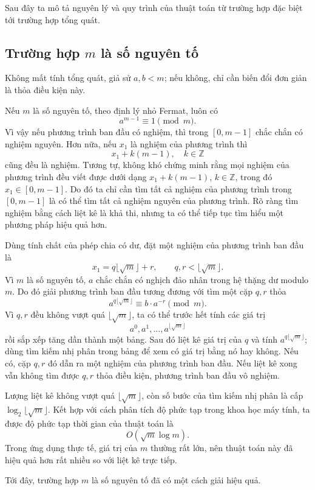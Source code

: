 \documentclass[11pt]{article}
\begin{document}
Sau đây ta mô tả nguyên lý và quy trình của thuật toán từ trường hợp đặc biệt
tới trường hợp tổng quát.

\subsection{Trường hợp \texorpdfstring{$m$}{m} là số nguyên tố}

Không mất tính tổng quát, giả sử $a,b<m$; nếu không, chỉ cần biến đổi đơn
giản là thỏa điều kiện này.

Nếu $m$ là số nguyên tố, theo định lý nhỏ Fermat, luôn có
\[
  a^{m-1}\equiv 1 \pmod m.
\]
Vì vậy nếu phương trình ban đầu có nghiệm, thì trong $[0,m-1]$ chắc chắn có
nghiệm nguyên. Hơn nữa, nếu $x_1$ là nghiệm của phương trình thì
\[
  x_1+k(m-1),\quad k\in\mathbb Z
\]
cũng đều là nghiệm. Tương tự, không khó chứng minh rằng mọi nghiệm của phương
trình đều viết được dưới dạng $x_1+k(m-1)$, $k\in\mathbb Z$, trong đó
$x_1\in[0,m-1]$. Do đó ta chỉ cần tìm tất cả nghiệm của phương trình trong
$[0,m-1]$ là có thể tìm tất cả nghiệm nguyên của phương trình. Rõ ràng tìm
nghiệm bằng cách liệt kê là khả thi, nhưng ta có thể tiếp tục tìm hiểu một
phương pháp hiệu quả hơn.

Dùng tính chất của phép chia có dư, đặt một nghiệm của phương trình ban đầu là
\[
  x_1=q\lfloor\sqrt m\rfloor+r,\qquad q,r<\lfloor\sqrt m\rfloor.
\]
Vì $m$ là số nguyên tố, $a$ chắc chắn có nghịch đảo nhân trong hệ thặng dư
modulo $m$. Do đó giải phương trình ban đầu tương đương với tìm một cặp
$q,r$ thỏa
\[
  a^{q\lfloor\sqrt m\rfloor}\equiv b\cdot a^{-r}\pmod m.
\]
Vì $q,r$ đều không vượt quá $\lfloor\sqrt m\rfloor$, ta có thể trước hết tính
các giá trị
\[
  a^0,a^1,\ldots,a^{\lfloor\sqrt m\rfloor}
\]
rồi sắp xếp tăng dần thành một bảng. Sau đó liệt kê giá trị của $q$ và tính
$a^{q\lfloor\sqrt m\rfloor}$; dùng tìm kiếm nhị phân trong bảng để xem có giá
trị bằng nó hay không. Nếu có, cặp $q,r$ đó dẫn ra một nghiệm của phương trình
ban đầu. Nếu liệt kê xong vẫn không tìm được $q,r$ thỏa điều kiện, phương
trình ban đầu vô nghiệm.

Lượng liệt kê không vượt quá $\lfloor\sqrt m\rfloor$, còn số bước của tìm
kiếm nhị phân là cấp $\log_2\lfloor\sqrt m\rfloor$. Kết hợp với cách phân tích
độ phức tạp trong khoa học máy tính, ta được độ phức tạp thời gian của thuật
toán là
\[
  O(\sqrt m\log m).
\]
Trong ứng dụng thực tế, giá trị của $m$ thường rất lớn, nên thuật toán này đã
hiệu quả hơn rất nhiều so với liệt kê trực tiếp.

Tới đây, trường hợp $m$ là số nguyên tố đã có một cách giải hiệu quả.
\end{document}
